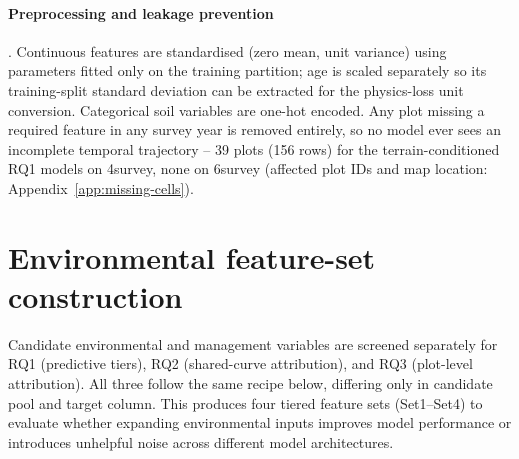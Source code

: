 \documentclass[11pt,a4paper]{report}
\begin{document}
\paragraph*{Preprocessing and leakage prevention}. Continuous features are standardised (zero mean, unit variance) using parameters fitted only on the training partition; age is scaled separately so its training-split standard deviation can be extracted for the physics-loss unit conversion. Categorical soil variables are one-hot encoded. Any plot missing a required feature in any survey year is removed entirely, so no model ever sees an incomplete temporal trajectory -- 39 plots (156 rows) for the terrain-conditioned RQ1 models on 4survey, none on 6survey (affected plot IDs and map location: Appendix~\ref{app:missing-cells}).

\section{Environmental feature-set construction}
\label{sec:feature-final}
Candidate environmental and management variables are screened separately for RQ1 (predictive tiers), RQ2 (shared-curve attribution), and RQ3 (plot-level attribution). All three follow the same recipe below, differing only in candidate pool and
target column. This produces four tiered feature sets (Set1–Set4) to evaluate whether expanding environmental inputs improves model performance or introduces unhelpful noise across different model architectures.
\end{document}
